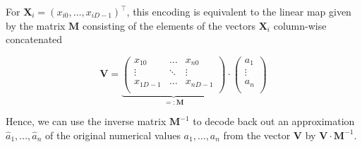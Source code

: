 For $\mathbf{X}_{i} = \left(x_{i0}, \ldots, x_{iD-1}\right)^{\intercal}$, this encoding is equivalent to the linear map given by the matrix $ \mathbf{M} $ consisting of the elements of the vectors $ \mathbf{X}_{i}$ column-wise concatenated

\begin{equation}
\label{eq:scalar_encoding_linear_map}
\mathbf{V} = \underbrace{\left(
\begin{matrix}
    x_{10} & \ldots & x_{n0} \\
    \vdots & \ddots & \vdots \\
    x_{1D-1} & \ldots & x_{nD-1} \\
\end{matrix}
\right)}_{=: \mathbf{M} } \cdot \left(
\begin{matrix}
a_{1} \\
\vdots \\
a_{n}\\ 
\end{matrix}
\right)
\end{equation}

Hence, we can use the inverse matrix $ \mathbf{M}^{-1}$ to decode back out an approximation $\hat{a}_{1}, \ldots, \hat{a}_{n}$ of the original numerical values $a_{1}, \ldots, a_{n}$ from the vector $ \mathbf{V}$ by $ \mathbf{V} \cdot \mathbf{M}^{-1}$.


